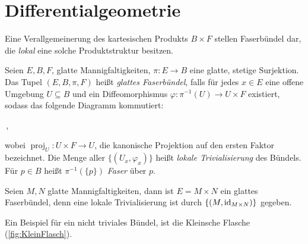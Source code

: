 \section{Differentialgeometrie}
Eine Verallgemeinerung des kartesischen Produkts $B\times F$ stellen
Faserbündel dar, die \emph{lokal} eine solche Produktstruktur besitzen. 
\begin{definition}[Faserbündel]
Seien $E,B,F$, glatte Mannigfaltigkeiten, $\pi:E\to B$ eine glatte, stetige
Surjektion.
Das Tupel $(E,B,\pi,F)$ heißt \emph{glattes Faserbündel},
falls für jedes $x\in E$ eine offene Umgebung $U\subseteq B$ und ein
Diffeomorphismus $\varphi:\pi^{-1}(U)\to U\times F$ existiert, sodass das
folgende Diagramm kommutiert:
\begin{center}
\,,
\end{center}
wobei $\operatorname{proj}_U:U\times F \to U$, die kanonische Projektion auf den
ersten Faktor bezeichnet. Die Menge aller $\{(U_x,\varphi_x)\}$ heißt
\emph{lokale Trivialisierung} des Bündels. Für $p\in B$ heißt $\pi^{-1}(\{p\})$
\emph{Faser} über $p$.  
\end{definition}
\begin{beispiel}
Seien $M,N$ glatte Mannigfaltigkeiten, dann ist $E=M\times N$ ein glattes
Faserbündel, denn eine lokale Trivialisierung
ist durch $\{(M,\operatorname{id}_{M\times N})\}$ gegeben.
\end{beispiel}
Ein Beispiel für ein nicht triviales Bündel, ist die Kleinsche Flasche
(\autoref{fig:KleinFlasch}). 
